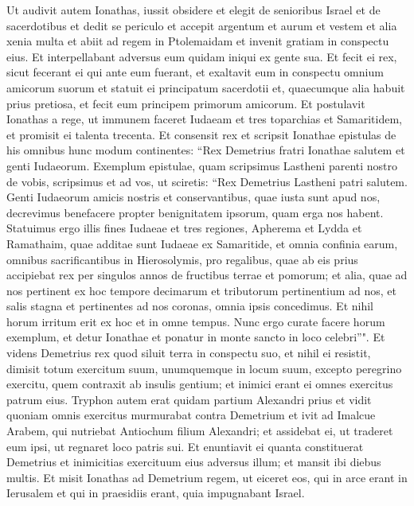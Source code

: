 \begin{biblechapter}
\verse Ut audivit autem Ionathas, iussit obsidere et elegit de senioribus Israel et de sacerdotibus et dedit se periculo 
\verse et accepit argentum et aurum et vestem et alia xenia multa et abiit ad regem in Ptolemaidam et invenit gratiam in conspectu eius. 
\verse Et interpellabant adversus eum quidam iniqui ex gente sua. 
\verse Et fecit ei rex, sicut fecerant ei qui ante eum fuerant, et exaltavit eum in conspectu omnium amicorum suorum 
\verse et statuit ei principatum sacerdotii et, quaecumque alia habuit prius pretiosa, et fecit eum principem primorum amicorum. 
\verse Et postulavit Ionathas a rege, ut immunem faceret Iudaeam et tres toparchias et Samaritidem, et promisit ei talenta trecenta. 
\verse Et consensit rex et scripsit Ionathae epistulas de his omnibus hunc modum continentes: 
\verse “Rex Demetrius fratri Ionathae salutem et genti Iudaeorum. 
\verse Exemplum epistulae, quam scripsimus Lastheni parenti nostro de vobis, scripsimus et ad vos, ut sciretis: 
\verse “Rex Demetrius Lastheni patri salutem. 
\verse Genti Iudaeorum amicis nostris et conservantibus, quae iusta sunt apud nos, decrevimus benefacere propter benignitatem ipsorum, quam erga nos habent. 
\verse Statuimus ergo illis fines Iudaeae et tres regiones, Apherema et Lydda et Ramathaim, quae additae sunt Iudaeae ex Samaritide, et omnia confinia earum, omnibus sacrificantibus in Hierosolymis, pro regalibus, quae ab eis prius accipiebat rex per singulos annos de fructibus terrae et pomorum; 
\verse et alia, quae ad nos pertinent ex hoc tempore decimarum et tributorum pertinentium ad nos, et salis stagna et pertinentes ad nos coronas, omnia ipsis concedimus. 
\verse Et nihil horum irritum erit ex hoc et in omne tempus. 
\verse Nunc ergo curate facere horum exemplum, et detur Ionathae et ponatur in monte sancto in loco celebri”". 
\verse Et videns Demetrius rex quod siluit terra in conspectu suo, et nihil ei resistit, dimisit totum exercitum suum, unumquemque in locum suum, excepto peregrino exercitu, quem contraxit ab insulis gentium; et inimici erant ei omnes exercitus patrum eius. 
\verse Tryphon autem erat quidam partium Alexandri prius et vidit quoniam omnis exercitus murmurabat contra Demetrium et ivit ad Imalcue Arabem, qui nutriebat Antiochum filium Alexandri; 
\verse et assidebat ei, ut traderet eum ipsi, ut regnaret loco patris sui. Et enuntiavit ei quanta constituerat Demetrius et inimicitias exercituum eius adversus illum; et mansit ibi diebus multis. 
\verse Et misit Ionathas ad Demetrium regem, ut eiceret eos, qui in arce erant in Ierusalem et qui in praesidiis erant, quia impugnabant Israel. 

\end{biblechapter}
